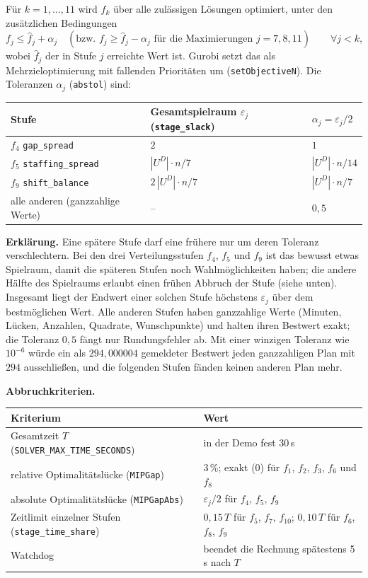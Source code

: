 \documentclass[11pt]{combiArticle}
\newcommand{\code}[1]{\texttt{#1}}
\begin{document}
Für $k = 1,\dots,11$ wird $f_k$ über alle zulässigen Lösungen optimiert, unter den zusätzlichen Bedingungen
\begin{equation}
  f_j \le \hat f_j + \alpha_j \quad (\text{bzw. } f_j \ge \hat f_j - \alpha_j \text{ für die Maximierungen } j = 7, 8, 11)
  \qquad \forall j < k, \label{obj:lex}
\end{equation}
wobei $\hat f_j$ der in Stufe $j$ erreichte Wert ist. Gurobi setzt das als Mehrzieloptimierung mit fallenden
Prioritäten um (\code{setObjectiveN}). Die Toleranzen $\alpha_j$ (\code{abstol}) sind:
\begin{center}
\small
\begin{tabular}{l l l}
\hline
Stufe & Gesamtspielraum $\varepsilon_j$ (\code{stage\_slack}) & $\alpha_j = \varepsilon_j/2$ \\
\hline
$f_4$ \code{gap\_spread} & $2$ & $1$ \\
$f_5$ \code{staffing\_spread} & $|U^{D}| \cdot n / 7$ & $|U^{D}| \cdot n / 14$ \\
$f_9$ \code{shift\_balance} & $2\,|U^{D}| \cdot n / 7$ & $|U^{D}| \cdot n / 7$ \\
alle anderen (ganzzahlige Werte) & -- & $0{,}5$ \\
\hline
\end{tabular}
\end{center}

\textbf{Erklärung.}
Eine spätere Stufe darf eine frühere nur um deren Toleranz verschlechtern. Bei den drei Verteilungsstufen $f_4$,
$f_5$ und $f_9$ ist das bewusst etwas Spielraum, damit die späteren Stufen noch Wahlmöglichkeiten haben; die
andere Hälfte des Spielraums erlaubt einen frühen Abbruch der Stufe (siehe unten). Insgesamt liegt der Endwert
einer solchen Stufe höchstens $\varepsilon_j$ über dem bestmöglichen Wert. Alle anderen Stufen haben ganzzahlige
Werte (Minuten, Lücken, Anzahlen, Quadrate, Wunschpunkte) und halten ihren Bestwert exakt; die Toleranz $0{,}5$
fängt nur Rundungsfehler ab. Mit einer winzigen Toleranz wie $10^{-6}$ würde ein als $294{,}000004$ gemeldeter
Bestwert jeden ganzzahligen Plan mit $294$ ausschließen, und die folgenden Stufen fänden keinen anderen Plan mehr.

\textbf{Abbruchkriterien.}
\begin{center}
\small
\begin{tabular}{l l}
\hline
Kriterium & Wert \\
\hline
Gesamtzeit $T$ (\code{SOLVER\_MAX\_TIME\_SECONDS}) & in der Demo fest 30\,s \\
relative Optimalitätslücke (\code{MIPGap}) & 3\,\%; exakt (0) für $f_1$, $f_2$, $f_3$, $f_6$ und $f_8$ \\
absolute Optimalitätslücke (\code{MIPGapAbs}) & $\varepsilon_j/2$ für $f_4$, $f_5$, $f_9$ \\
Zeitlimit einzelner Stufen (\code{stage\_time\_share}) & $0{,}15\,T$ für $f_5$, $f_7$, $f_{10}$; $0{,}10\,T$ für $f_6$, $f_8$, $f_9$ \\
Watchdog & beendet die Rechnung spätestens 5\,s nach $T$ \\
\hline
\end{tabular}
\end{center}
\end{document}
